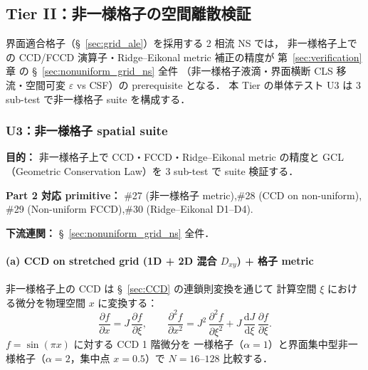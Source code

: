 %
\subsection{Tier II：非一様格子の空間離散検証}
\label{sec:verify_nonuniform_suite}

界面適合格子（§~\ref{sec:grid_ale}）を採用する 2 相流 NS では，
非一様格子上での CCD/FCCD 演算子・Ridge--Eikonal metric 補正の精度が
第~\ref{sec:verification}章 の §~\ref{sec:nonuniform_grid_ns} 全件
（非一様格子液滴・界面横断 CLS 移流・空間可変 $\varepsilon$ vs CSF）の
prerequisite となる．
本 Tier の単体テスト U3 は 3 sub-test で非一様格子 suite を構成する．

\subsubsection{U3：非一様格子 spatial suite}
\label{sec:U3_nonuniform_suite}

\noindent\textbf{目的：}
非一様格子上で CCD・FCCD・Ridge--Eikonal metric の精度と GCL（Geometric Conservation Law）を
3 sub-test で suite 検証する．

\noindent\textbf{Part 2 対応 primitive：}
\#27 (非一様格子 metric),\#28 (CCD on non-uniform),
\#29 (Non-uniform FCCD),\#30 (Ridge--Eikonal D1--D4).

\noindent\textbf{下流連関：}
§~\ref{sec:nonuniform_grid_ns} 全件．

\paragraph{(a) CCD on stretched grid (1D + 2D 混合 $D_{xy}$) + 格子 metric}
\label{sec:gcl_verification}

非一様格子上の CCD は §~\ref{sec:CCD} の連鎖則変換を通じて
計算空間 $\xi$ における微分を物理空間 $x$ に変換する：
\begin{equation}
  \frac{\partial f}{\partial x} = J\,\frac{\partial f}{\partial\xi}, \qquad
  \frac{\partial^2 f}{\partial x^2}
    = J^2\,\frac{\partial^2 f}{\partial\xi^2}
      + J\,\frac{\mathrm{d}J}{\mathrm{d}\xi}\,\frac{\partial f}{\partial\xi}.
  \label{eq:gcl_chain}
\end{equation}
$f = \sin(\pi x)$ に対する CCD 1 階微分を
一様格子（$\alpha = 1$）と界面集中型非一様格子（$\alpha = 2$，集中点 $x = 0.5$）で
$N = 16$--$128$ 比較する．

